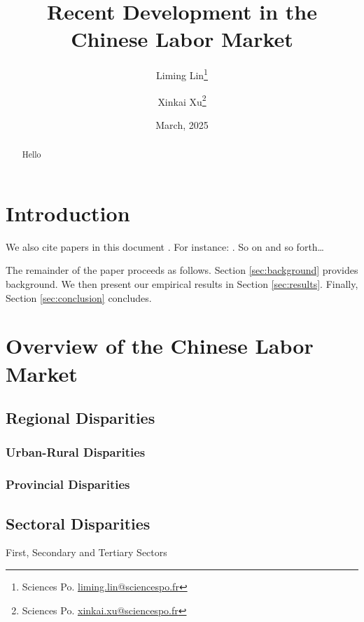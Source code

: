 \documentclass[12pt]{article}
\title{ \vspace*{-2.5cm} \hspace*{-0.5cm} Recent Development in the Chinese Labor Market \vspace*{0.5cm}}
\author{Liming Lin\thanks{Sciences Po.
\href{mailto:liming.lin@sciencespo.fr}{liming.lin@sciencespo.fr}} \and Xinkai Xu\thanks{Sciences Po. \href{mailto:xinkai.xu@sciencespo.fr}{xinkai.xu@sciencespo.fr}}}
\date{ \vspace*{0.5cm} March, 2025}
\begin{document}
\bgroup
\let\footnoterule\relax

\begin{singlespace}
\maketitle


\begin{abstract}
    \noindent Hello
\end{abstract}
\end{singlespace}
\thispagestyle{empty}

\clearpage
\egroup
\setcounter{page}{1}


\section{Introduction\label{sec:introduction}}

 

We also cite papers in this document \citep{Chetty2013}. For instance: \citet{Hansen1992}. So on and so forth\ldots

The remainder of the paper proceeds as follows. Section \ref{sec:background} provides background. We then present our
empirical results in Section \ref{sec:results}. Finally, Section \ref{sec:conclusion} concludes. 

\section{Overview of the Chinese Labor Market \label{sec:background}}
\subsection{Regional Disparities}
\subsubsection{Urban-Rural Disparities}
\subsubsection{Provincial Disparities}
\subsection{Sectoral Disparities}
First, Secondary and Tertiary Sectors
\end{document}
